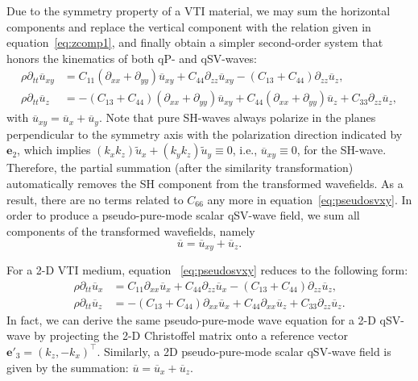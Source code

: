 Due to the symmetry property of a VTI material, we may sum the horizontal components and replace the vertical component
with the relation given in equation~\ref{eq:zcomp1}, and finally obtain a simpler second-order system that honors the kinematics of both qP- and qSV-waves:
\begin{equation}
\label{eq:pseudosvxy}
\begin{split}
\rho\partial_{tt}\overline{u}_{xy}&=C_{11}(\partial_{xx}+\partial_{yy})\overline{u}_{xy}+C_{44}\partial_{zz}{\overline{u}}_{xy}-(C_{13}+C_{44})\partial_{zz}{\overline{u}_z},\\
\rho\partial_{tt}\overline{u}_z&=-(C_{13}+C_{44})(\partial_{xx}+\partial_{yy})\overline{u}_{xy}+C_{44}(\partial_{xx}+\partial_{yy})\overline{u}_z+C_{33}\partial_{zz}\overline{u}_z,
\end{split}
\end{equation}
with $\overline{u}_{xy}=\overline{u}_x+\overline{u}_y$.
Note that pure SH-waves always polarize in the planes perpendicular to the symmetry axis with the polarization direction indicated by $\mathbf{e}_2$,
which implies $(k_xk_z)\widetilde{u}_{x}+(k_yk_z)\widetilde{u}_{y}\equiv0$, i.e., $\overline{u}_{xy}\equiv0$, for the SH-wave.
Therefore, the partial summation (after the similarity transformation) automatically removes the SH component from the transformed wavefields.
As a result, there are no terms related to $C_{66}$ any more in equation~\ref{eq:pseudosvxy}.
In order to produce a pseudo-pure-mode scalar qSV-wave field, we sum all components of the transformed wavefields, namely
\begin{equation}
\label{eq:scalalr}
\overline{u}=\overline{u}_{xy}+\overline{u}_{z}.
\end{equation}

For a 2-D VTI medium, equation ~\ref{eq:pseudosvxy} reduces to the following form:
\begin{equation}
\label{eq:pseudosvx}
\begin{split}
\rho\partial_{tt}\overline{u}_x&=C_{11}\partial_{xx}\overline{u}_x+C_{44}\partial_{zz}{\overline{u}}_x
-(C_{13}+C_{44})\partial_{zz}{\overline{u}_z},\\
\rho\partial_{tt}\overline{u}_z&=-(C_{13}+C_{44})\partial_{xx}\overline{u}_x
+C_{44}\partial_{xx}\overline{u}_z+C_{33}\partial_{zz}\overline{u}_z.
\end{split}
\end{equation}
In fact, we can derive the same pseudo-pure-mode wave equation for a 2-D qSV-wave by
projecting the 2-D Christoffel matrix onto a reference vector
$\mathbf{e}'_3=(k_z, -k_x)^{\top}$.
Similarly, a 2D pseudo-pure-mode scalar qSV-wave field is given by the summation: $\overline{u}=\overline{u}_{x}+\overline{u}_{z}$.

